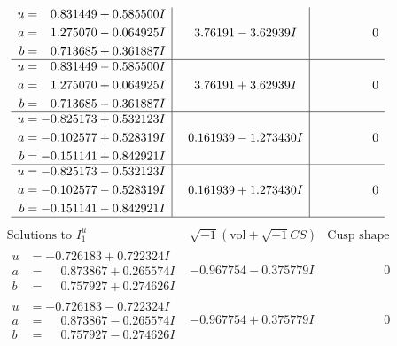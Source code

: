 \documentclass[1p]{elsarticle_modified}
\theoremstyle{definition}
\newcommand{\I}{\sqrt{-1}}
\begin{document}
$$\begin{array}{c|c|c}
\begin{aligned}
u &= \phantom{-}0.831449 + 0.585500 I \\
a &= \phantom{-}1.275070 - 0.064925 I \\
b &= \phantom{-}0.713685 + 0.361887 I\end{aligned}
 & \phantom{-}3.76191 - 3.62939 I & \phantom{-0.000000 } 0 \\ \hline\begin{aligned}
u &= \phantom{-}0.831449 - 0.585500 I \\
a &= \phantom{-}1.275070 + 0.064925 I \\
b &= \phantom{-}0.713685 - 0.361887 I\end{aligned}
 & \phantom{-}3.76191 + 3.62939 I & \phantom{-0.000000 } 0 \\ \hline\begin{aligned}
u &= -0.825173 + 0.532123 I \\
a &= -0.102577 + 0.528319 I \\
b &= -0.151141 + 0.842921 I\end{aligned}
 & \phantom{-}0.161939 - 1.273430 I & \phantom{-0.000000 } 0 \\ \hline\begin{aligned}
u &= -0.825173 - 0.532123 I \\
a &= -0.102577 - 0.528319 I \\
b &= -0.151141 - 0.842921 I\end{aligned}
 & \phantom{-}0.161939 + 1.273430 I & \phantom{-0.000000 } 0\\
 \hline 
 \end{array}$$\newpage$$\begin{array}{c|c|c}  
\text{Solutions to }I^u_{1}& \I (\text{vol} + \sqrt{-1}CS) & \text{Cusp shape}\\
 \hline 
\begin{aligned}
u &= -0.726183 + 0.722324 I \\
a &= \phantom{-}0.873867 + 0.265574 I \\
b &= \phantom{-}0.757927 + 0.274626 I\end{aligned}
 & -0.967754 - 0.375779 I & \phantom{-0.000000 } 0 \\ \hline\begin{aligned}
u &= -0.726183 - 0.722324 I \\
a &= \phantom{-}0.873867 - 0.265574 I \\
b &= \phantom{-}0.757927 - 0.274626 I\end{aligned}
 & -0.967754 + 0.375779 I & \phantom{-0.000000 } 0 \\ \hline\begin{aligned}

\end{aligned}
\end{array}$$
\end{document}
